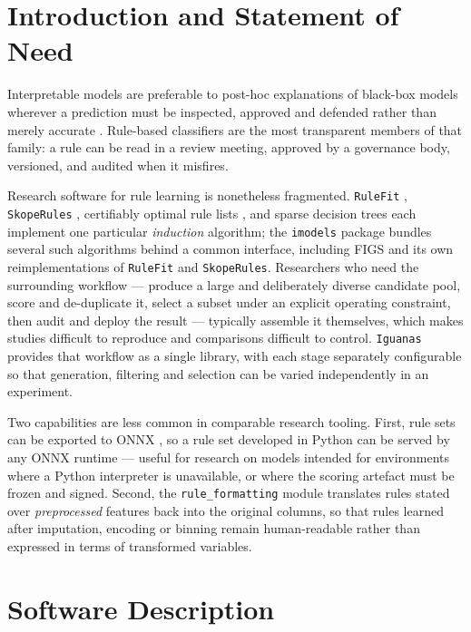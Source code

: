 \documentclass[twoside,11pt]{article}
\begin{document}
\section{Introduction and Statement of Need}

Interpretable models are preferable to post-hoc explanations of black-box
models wherever a prediction must be inspected, approved and defended rather
than merely accurate \citep{rudin2019,rudin2022}. Rule-based classifiers are
the most transparent members of that family: a rule can be read in a review
meeting, approved by a governance body, versioned, and audited when it
misfires.

Research software for rule learning is nonetheless fragmented. \texttt{RuleFit}
\citep{friedman2008}, \texttt{SkopeRules} \citep{skope}, certifiably optimal
rule lists \citep{angelino2017}, and sparse decision trees \citep{lin2020}
each implement one particular \emph{induction} algorithm; the
\texttt{imodels} package \citep{singh2021} bundles several such algorithms
behind a common interface, including FIGS \citep{tan2025} and its own
reimplementations of \texttt{RuleFit} and \texttt{SkopeRules}. Researchers who need the surrounding workflow ---
produce a large and deliberately diverse candidate pool, score and de-duplicate
it, select a subset under an explicit operating constraint, then audit and
deploy the result --- typically assemble it themselves, which makes studies
difficult to reproduce and comparisons difficult to control. \texttt{Iguanas}
provides that workflow as a single library, with each stage separately
configurable so that generation, filtering and selection can be varied
independently in an experiment.

Two capabilities are less common in comparable research tooling. First, rule
sets can be exported to ONNX \citep{onnx}, so a rule set developed in Python
can be served by any ONNX runtime --- useful for research on models intended
for environments where a Python interpreter is unavailable, or where the
scoring artefact must be frozen and signed. Second, the \texttt{rule\_formatting}
module translates rules stated over \emph{preprocessed} features back into the
original columns, so that rules learned after imputation, encoding or binning
remain human-readable rather than expressed in terms of transformed variables.

\section{Software Description}
\end{document}
